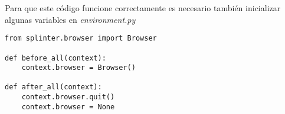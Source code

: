 Para que este código funcione correctamente es necesario también inicializar
algunas variables en {\it environment.py}

{\scriptsize
  \begin{verbatim}
from splinter.browser import Browser

def before_all(context):
    context.browser = Browser()

def after_all(context):
    context.browser.quit()
    context.browser = None
  \end{verbatim}
}
